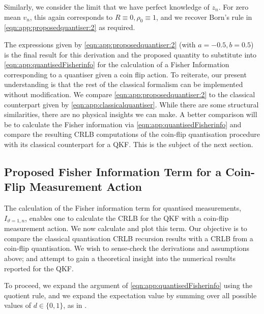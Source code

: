 Similarly, we consider the limit that we have perfect knowledge of $z_n$. For zero mean $v_n$, this again corresponds to $R\equiv0, \rho_0 \equiv 1$, and we recover Born's rule in \cref{eqn:app:proposedquantiser:2} as required. 

The expressions given by \cref{eqn:app:proposedquantiser:2} (with $a= -0.5, b=0.5$) is the final result for this derivation and the proposed quantity to substitute into \cref{eqn:app:quantisedFisherinfo} for the calculation of a Fisher Information corresponding to a quantiser given a coin flip action. To reiterate, our present understanding is that the rest of the classical formalism can be implemented without modification. We compare \cref{eqn:app:proposedquantiser:2} to the classical counterpart given by  \cref{eqn:app:classicalquantiser}. While there are some structural similarities, there are no physical insights we can make. A better comparison will be to calculate the Fisher information via \cref{eqn:app:quantisedFisherinfo} and compare the resulting CRLB computations of the coin-flip quantisation procedure with its classical counterpart for a QKF. This is the subject of the next section. 


\subsection{Proposed Fisher Information Term for a Coin-Flip Measurement Action}

The calculation of the Fisher information term for quantised measurements, $I_{\vartheta=1, n}$, enables one to calculate the CRLB for the QKF with a coin-flip measurement action. We now calculate and plot this term. Our objective is to compare the classical quantisation CRLB recursion results with a CRLB from a coin-flip quantisation. We wish to sense-check the derivations and assumptions above; and attempt to gain a theoretical insight into the numerical results reported for the QKF. 

To proceed, we expand the argument of \cref{eqn:app:quantisedFisherinfo} using the quotient rule, and we expand the expectation value by summing over all possible values of $d\in \{0,1 \}$, as in \cite{karlsson2005}. 

